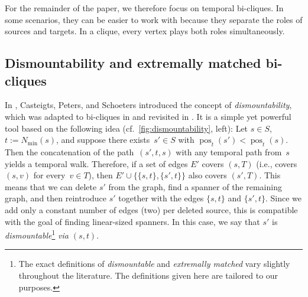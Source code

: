\documentclass[11pt, letterpaper]{article}
\DeclareMathOperator{\pos}{pos}
\theoremstyle{definition}
\theoremstyle{plain}
\begin{document}
For the remainder of the paper, we therefore focus on temporal bi-cliques.
In some scenarios, they can be easier to work with because they separate the roles of sources and targets. 
In a clique, every vertex plays both roles simultaneously.


\subsection{Dismountability and extremally matched bi-cliques}

\newcommand{\minneighbor}{N_\mathrm{min}}
\newcommand{\maxneighbor}{N_\mathrm{max}}


In \cite{Casteigts21}, Casteigts, Peters, and Schoeters introduced the concept of \emph{dismountability}, which was adapted to bi-cliques in \cite{Angrick24} and revisited in \cite{Carnevale25}.
It is a simple yet powerful tool based on the following idea (cf.~\cref{fig:dismountability}, left):
Let $s\in S$, $t:=\minneighbor(s)$, and suppose there exists~$s'\in S$ with $\pos_t(s')< \pos_t(s)$.
Then the concatenation of the path~$(s',t,s)$ with any temporal path from~$s$ yields a temporal walk.
Therefore, if a set of edges $E'$ covers $(s,T)$ (i.e., covers $(s,v)$ for every~$v\in T$), then
$E'\cup \{\{s,t\}, \{s',t\}\}$ also covers $(s',T)$.
This means that we can delete $s'$ from the graph, find a spanner of the remaining graph, and then reintroduce $s'$ together with the edges $\{s,t\}$ and $\{s',t\}$.
Since we add only a constant number of edges (two) per deleted source, this is compatible with the goal of finding linear-sized spanners.
In this case, we say that $s'$ is \emph{dismountable}\footnote{
  The exact definitions of \emph{dismountable} and \emph{extremally matched}
  vary slightly throughout the literature.
  The definitions given here are tailored to our purposes.}
\emph{via $(s,t)$}.
\end{document}
